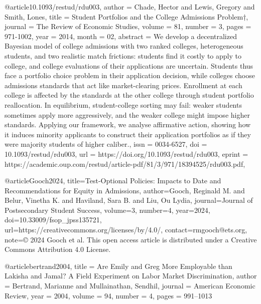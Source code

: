 @article{10.1093/restud/rdu003,
    author = {Chade, Hector and Lewis, Gregory and Smith, Lones},
    title = {Student Portfolios and the College Admissions Problem†},
    journal = {The Review of Economic Studies},
    volume = {81},
    number = {3},
    pages = {971-1002},
    year = {2014},
    month = {02},
    abstract = {We develop a decentralized Bayesian model of college admissions with two ranked colleges, heterogeneous students, and two realistic match frictions: students find it costly to apply to college, and college evaluations of their applications are uncertain. Students thus face a portfolio choice problem in their application decision, while colleges choose admissions standards that act like market-clearing prices. Enrollment at each college is affected by the standards at the other college through student portfolio reallocation. In equilibrium, student-college sorting may fail: weaker students sometimes apply more aggressively, and the weaker college might impose higher standards. Applying our framework, we analyse affirmative action, showing how it induces minority applicants to construct their application portfolios as if they were majority students of higher caliber.},
    issn = {0034-6527},
    doi = {10.1093/restud/rdu003},
    url = {https://doi.org/10.1093/restud/rdu003},
    eprint = {https://academic.oup.com/restud/article-pdf/81/3/971/18394525/rdu003.pdf},
}

@article{Gooch2024,
  title={Test-Optional Policies: Impacts to Date and Recommendations for Equity in Admissions},
  author={Gooch, Reginald M. and Belur, Vinetha K. and Haviland, Sara B. and Liu, Ou Lydia},
  journal={Journal of Postsecondary Student Success},
  volume={3},
  number={4},
  year={2024},
  doi={10.33009/fsop_jpss135721},
  url={https://creativecommons.org/licenses/by/4.0/},
  contact={rmgooch@ets.org},
  note={© 2024 Gooch et al. This open access article is distributed under a Creative Commons Attribution 4.0 License.}
}

@article{bertrand2004,
  title = {Are Emily and Greg More Employable than Lakisha and Jamal? A Field Experiment on Labor Market Discrimination},
  author = {Bertrand, Marianne and Mullainathan, Sendhil},
  journal = {American Economic Review},
  year = {2004},
  volume = {94},
  number = {4},
  pages = {991--1013}
}